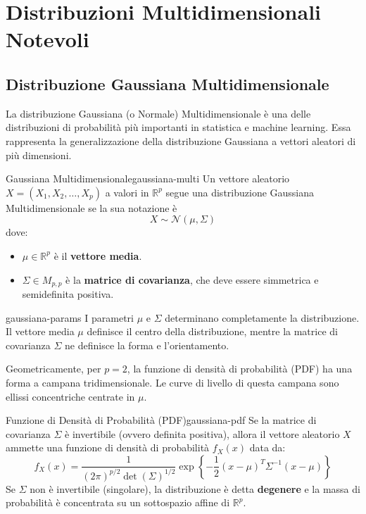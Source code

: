 \section{Distribuzioni Multidimensionali Notevoli}

\subsection{Distribuzione Gaussiana Multidimensionale}

La distribuzione Gaussiana (o Normale) Multidimensionale è una delle
distribuzioni di probabilità più importanti in statistica e machine learning.
Essa rappresenta la generalizzazione della distribuzione Gaussiana a vettori
aleatori di più dimensioni.

\begin{definizione}{Gaussiana Multidimensionale}{gaussiana-multi}
Un vettore aleatorio $X = (X_1, X_2, \dots, X_p)$ a valori in $\mathbb{R}^p$
segue una distribuzione Gaussiana Multidimensionale se la sua notazione è
$$
X \sim \mathcal{N}(\mu, \Sigma)
$$
dove:
\begin{itemize}
    \item $\mu \in \mathbb{R}^p$ è il \textbf{vettore media}.
    \item $\Sigma \in M_{p,p}$ è la \textbf{matrice di covarianza}, che deve
    essere simmetrica e semidefinita positiva.
\end{itemize}
\end{definizione}

\begin{nota}{}{gaussiana-params}
I parametri $\mu$ e $\Sigma$ determinano completamente la distribuzione. Il
vettore media $\mu$ definisce il centro della distribuzione, mentre la matrice
di covarianza $\Sigma$ ne definisce la forma e l'orientamento.
\end{nota}

Geometricamente, per $p=2$, la funzione di densità di probabilità (PDF) ha una
forma a campana tridimensionale. Le curve di livello di questa campana sono
ellissi concentriche centrate in $\mu$.

\begin{proposizione}{Funzione di Densità di Probabilità (PDF)}{gaussiana-pdf}
Se la matrice di covarianza $\Sigma$ è invertibile (ovvero definita positiva),
allora il vettore aleatorio $X$ ammette una funzione di densità di probabilità
$f_X(x)$ data da:
$$
f_X(x) = \frac{1}{(2\pi)^{p/2} \det(\Sigma)^{1/2}}
\exp\left\{-\frac{1}{2}(x-\mu)^T \Sigma^{-1} (x-\mu)\right\}
$$
Se $\Sigma$ non è invertibile (singolare), la distribuzione è detta
\textbf{degenere} e la massa di probabilità è concentrata su un sottospazio
affine di $\mathbb{R}^p$.
\end{proposizione}

